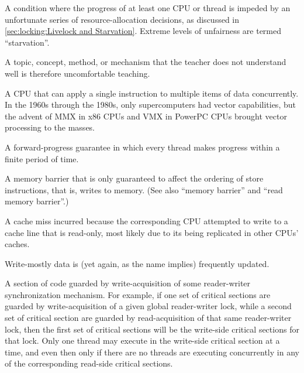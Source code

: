 \begin{description}
	A condition where the progress of at least one CPU or thread
	is impeded by an unfortunate series of resource-allocation
	decisions, as discussed in
	\cref{sec:locking:Livelock and Starvation}.
	Extreme levels of unfairness are termed ``starvation''.
\item[\IXG{Unteachable}:]
	A topic, concept, method, or mechanism that the teacher does
	not understand well is therefore uncomfortable teaching.
\item[\IXGr{Vector CPU}:]
	A CPU that can apply a single instruction to multiple items of
	data concurrently.
	In the 1960s through the 1980s, only supercomputers had vector
	capabilities, but the advent of MMX in x86 CPUs and VMX in
	PowerPC CPUs brought vector processing to the masses.
\item[\IXG{Wait Free}:]
	A forward-progress guarantee in which every thread makes
	progress within a finite period of time.
\item[\IXGh{Write}{Memory Barrier}:]
	A memory barrier that is only guaranteed to affect the ordering
	of store instructions, that is, writes to memory.
	(See also ``memory barrier'' and ``read memory barrier''.)
\item[\IXGalth{Write Miss}{write}{cache miss}:]
	A cache miss incurred because the corresponding CPU attempted
	to write to a cache line that is read-only, most likely due
	to its being replicated in other CPUs' caches.
\item[\IXG{Write Mostly}:]
	Write-mostly data is (yet again, as the name implies) frequently
	updated.
\item[\IXGh{Write-Side}{Critical Section}:]
	A section of code guarded by write-acquisition of
	some reader-writer synchronization mechanism.
	For example, if one set of critical sections are guarded by
	write-acquisition of
	a given global reader-writer lock, while a second set of critical
	section are guarded by read-acquisition of that same reader-writer
	lock, then the first set of critical sections will be the
	write-side critical sections for that lock.
	Only one thread may execute in the write-side critical section
	at a time, and even then only if there are no threads are
	executing concurrently in any of the corresponding read-side
	critical sections.
\end{description}
